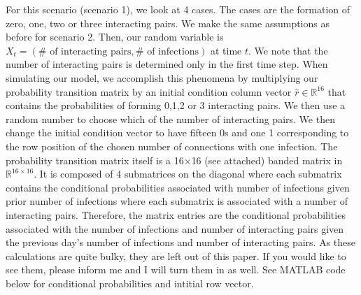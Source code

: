 \documentclass[12pt]{article}
\numberwithin{equation}{section}
\begin{document}
\begin{enumerate}
\begin{enumerate}
For this scenario (scenario 1), we look at 4 cases. The cases are the formation of zero, one, two or three interacting pairs. We make the same assumptions as before for scenario 2. Then, our random variable is $X_t=(\# \text{ of interacting pairs},\# \text{ of infections})$ at time $t$. We note that the number of interacting pairs is determined only in the first time step. When simulating our model, we accomplish this phenomena by multiplying our probability transition matrix by an initial condition column vector $\hat{r}\in\mathbb{R}^{16}$  that contains the probabilities of forming 0,1,2 or 3 interacting pairs. We then use a random number to choose which of the number of interacting pairs. We then change the initial condition vector to have fifteen 0s and one 1 corresponding to the row position of the chosen number of connections with one infection. The probability transition matrix itself is a 16$\times$16 (see attached) banded matrix in $\mathbb{R}^{16\times16}$. It is composed of 4 submatrices on the diagonal where each submatrix contains the conditional probabilities associated with number of infections given prior number of infections where each submatrix is associated with a number of interacting pairs. Therefore, the matrix entries are the conditional probabilities associated with the number of infections and number of interacting pairs given the previous day's number of infections and number of interacting pairs. As these calculations are quite bulky, they are left out of this paper. If you would like to see them, please inform me and I will turn them in as well. See MATLAB code below for conditional probabilities and intitial row vector.




\end{enumerate}
\end{enumerate}
\end{document}
